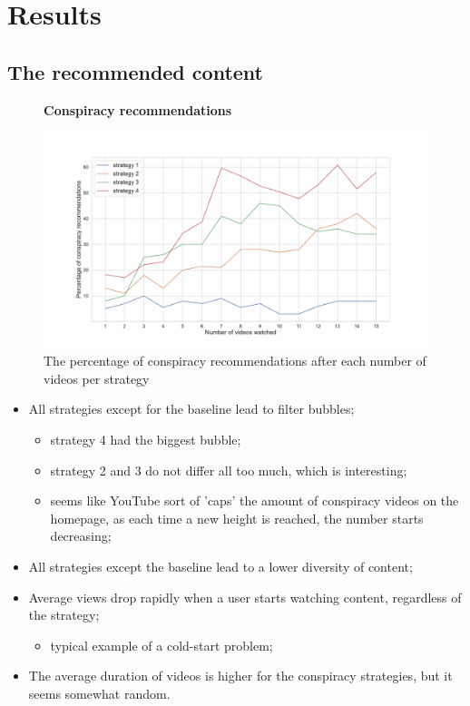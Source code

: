 \documentclass[../main.tex]{subfiles}
\begin{document}
\section{Results}



\subsection{The recommended content}

\begin{figure}[ht]
  \textbf{Conspiracy recommendations}\par\medskip
  \centering
  \includegraphics[keepaspectratio, width=\textwidth]{images/conspiracy_recs.pdf}
  \caption{The percentage of conspiracy recommendations after each number of videos per strategy}
  \label{fig:con_recs}
\end{figure}

\begin{itemize}
    \item All strategies except for the baseline lead to filter bubbles;
    \begin{itemize}
        \item strategy 4 had the biggest bubble;
        \item strategy 2 and 3 do not differ all too much, which is interesting;
        \item seems like YouTube sort of 'caps' the amount of conspiracy videos on the homepage, as each time a new height is reached, the number starts decreasing;
    \end{itemize}
    \item All strategies except the baseline lead to a lower diversity of content;
    \item Average views drop rapidly when a user starts watching content, regardless of the strategy;
    \begin{itemize}
        \item typical example of a cold-start problem;
    \end{itemize}
    \item The average duration of videos is higher for the conspiracy strategies, but it seems somewhat random.
\end{itemize}
\end{document}
